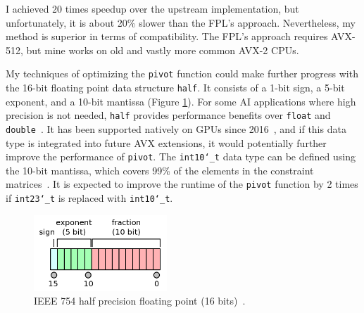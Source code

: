 \documentclass[logo,bsc,singlespacing,parskip]{infthesis}
\newcommand{\dthalfi}{\texttt{int10\char`_t}}
\newcommand{\dthalf}{\texttt{half}}
\newcommand{\dtfloat}{\texttt{float}}
\newcommand{\dtfloati}{\texttt{int23\char`_t}}
\newcommand{\dtdouble}{\texttt{double}}
\newcommand{\pivot}{\texttt{pivot}}
\begin{document}
I achieved 20 times speedup over the upstream implementation, but unfortunately,
it is about 20\% slower than the FPL's approach. Nevertheless, my method is
superior in terms of compatibility. The FPL's approach requires
AVX-512, but mine works on old and vastly more common AVX-2
CPUs.


My techniques of optimizing the \texttt{pivot} function could make further
progress with the 16-bit floating point data structure \dthalf{}. It consists of
a 1-bit sign, a 5-bit exponent, and a 10-bit mantissa (Figure
\ref{fig:ieee-f16}). For some AI applications where high precision is not
needed, \dthalf{} provides performance benefits over \dtfloat{} and
\dtdouble{}~\cite{fp16-fast}. It has been supported natively on GPUs since
2016~\cite{pascal-intro-fp16}, and if this data type is integrated into future
AVX extensions, it would potentially further improve the performance of
\pivot{}. The \dthalfi{} data type can be defined using the 10-bit
mantissa, which covers 99\% of the elements in the constraint
matrices~\cite{FPL1}. It is expected to improve the runtime of the \pivot{}
function by 2 times if \dtfloati{} is replaced with \dthalfi{}.


\begin{figure}[H]
    \begin{center}
    \includegraphics[width=50mm,scale=0.1]{image/ieee-f16.png}
    \end{center}
    \caption{IEEE 754 half precision floating point (16 bits)~\cite{fp16-diagram}.}
    \label{fig:ieee-f16}
\end{figure}



\end{document}
